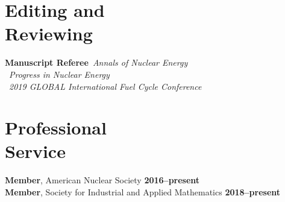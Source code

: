 \documentclass[margin,line]{resume}
\begin{document}
\begin{resume}
\section{\mysidestyle Editing and\\Reviewing}
    \textbf{Manuscript Referee}~\hfill \emph{Annals of Nuclear Energy}\\%
    					\mbox{}~\hfill \emph{Progress in Nuclear Energy}\\%
						\mbox{}~\hfill \emph{2019 GLOBAL International Fuel 
    Cycle Conference}\\%
\section{\mysidestyle Professional\\Service}
\textbf{Member}, American Nuclear Society  \hfill 
\textbf{2016--present}\vspace{.5mm}\\
\textbf{Member}, Society for Industrial and Applied Mathematics  \hfill 
\textbf{2018--present}\vspace{.5mm}\\%

\end{resume}
\end{document}
